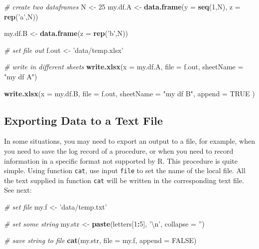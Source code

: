 \documentclass[11pt,]{book}
\newenvironment{Shaded}{\begin{snugshade}}{\end{snugshade}}
\newcommand{\KeywordTok}[1]{\textcolor[rgb]{0.27,0.27,0.27}{\textbf{#1}}}
\newcommand{\DataTypeTok}[1]{\textcolor[rgb]{0.27,0.27,0.27}{#1}}
\newcommand{\DecValTok}[1]{\textcolor[rgb]{0.06,0.06,0.06}{#1}}
\newcommand{\CharTok}[1]{\textcolor[rgb]{0.5,0.5,0.5}{#1}}
\newcommand{\StringTok}[1]{\textcolor[rgb]{0.5,0.5,0.5}{#1}}
\newcommand{\CommentTok}[1]{\textcolor[rgb]{0.56,0.35,0.01}{\textit{#1}}}
\newcommand{\OtherTok}[1]{\textcolor[rgb]{0.56,0.35,0.01}{#1}}
\newcommand{\OperatorTok}[1]{\textcolor[rgb]{0.81,0.36,0.00}{\textbf{#1}}}
\newcommand{\NormalTok}[1]{#1}
\begin{document}
\begin{Shaded}
\begin{Highlighting}[]
\CommentTok{# create two dataframes}
\NormalTok{N <-}\StringTok{ }\DecValTok{25}
\NormalTok{my.df.A <-}\StringTok{ }\KeywordTok{data.frame}\NormalTok{(}\DataTypeTok{y =} \KeywordTok{seq}\NormalTok{(}\DecValTok{1}\NormalTok{,N), }
                      \DataTypeTok{z =} \KeywordTok{rep}\NormalTok{(}\StringTok{'a'}\NormalTok{,N))}

\NormalTok{my.df.B <-}\StringTok{ }\KeywordTok{data.frame}\NormalTok{(}\DataTypeTok{z =} \KeywordTok{rep}\NormalTok{(}\StringTok{'b'}\NormalTok{,N))}

\CommentTok{# set file out}
\NormalTok{f.out <-}\StringTok{ 'data/temp.xlsx'}

\CommentTok{# write in different sheets}
\KeywordTok{write.xlsx}\NormalTok{(}\DataTypeTok{x =}\NormalTok{ my.df.A, }
           \DataTypeTok{file =}\NormalTok{ f.out, }
           \DataTypeTok{sheetName =} \StringTok{"my df A"}\NormalTok{)}

\KeywordTok{write.xlsx}\NormalTok{(}\DataTypeTok{x =}\NormalTok{ my.df.B, }
           \DataTypeTok{file =}\NormalTok{ f.out, }
           \DataTypeTok{sheetName =} \StringTok{"my df B"}\NormalTok{, }
           \DataTypeTok{append =} \OtherTok{TRUE}\NormalTok{ )}
\end{Highlighting}
\end{Shaded}

\subsection{Exporting Data to a Text
File}\label{exporting-data-to-a-text-file}

In some situations, you may need to export an output to a file, for
example, when you need to save the log record of a procedure, or when
you need to record information in a specific format not supported by R.
This procedure is quite simple. Using function \texttt{cat}, use input
\texttt{file} to set the name of the local file. All the text supplied
in function \texttt{cat} will be written in the corresponding text file.
See next: 

\begin{Shaded}
\begin{Highlighting}[]
\CommentTok{# set file}
\NormalTok{my.f <-}\StringTok{ 'data/temp.txt'}

\CommentTok{# set some string}
\NormalTok{my.str <-}\StringTok{ }\KeywordTok{paste}\NormalTok{(letters[}\DecValTok{1}\OperatorTok{:}\DecValTok{5}\NormalTok{], }\StringTok{'}\CharTok{\textbackslash{}n}\StringTok{'}\NormalTok{, }\DataTypeTok{collapse =} \StringTok{''}\NormalTok{)}

\CommentTok{# save string to file}
\KeywordTok{cat}\NormalTok{(my.str, }\DataTypeTok{file =}\NormalTok{ my.f, }\DataTypeTok{append =} \OtherTok{FALSE}\NormalTok{)}
\end{Highlighting}
\end{Shaded}
\end{document}
